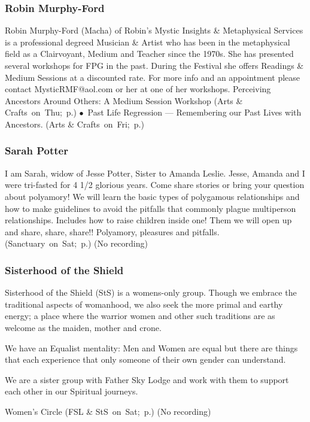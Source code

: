 \subsubsection{Robin Murphy-Ford} %
{  \small  Robin Murphy-Ford (Macha) of Robin's Mystic Insights \& Metaphysical Services is a professional degreed Musician \& Artist who has been in the metaphysical field as a Clairvoyant, Medium and Teacher since the 1970s.  She has presented several workshops for FPG in the past.  During the Festival she offers Readings \& Medium Sessions at a discounted rate.  For more info and an appointment please contact MysticRMF@aol.com or her at one of her workshops.   
 } %
\hspace{2em} {\footnotesize Perceiving Ancestors Around Others:  A Medium Session Workshop (Arts \& Crafts~on~Thu;~p.\pageref{Thu-Ford2}) $\bullet$~Past Life Regression --- Remembering our Past Lives with Ancestors. (Arts \& Crafts~on~Fri;~p.\pageref{Fri-Ford1})}

\vspace{6pt}

\subsubsection{Sarah Potter} %
{  \small  I am Sarah, widow of Jesse Potter, Sister to Amanda Leslie. Jesse, Amanda and I were tri-fasted for 4 1/2 glorious years. Come share stories or bring your question about polyamory! We will learn the basic types of polygamous relationships and how to make guidelines to avoid the pitfalls that commonly plague multiperson relationships. Includes how to raise children inside one! Them we will open up and share, share, share!! } %
\hspace{2em} {\footnotesize Polyamory, pleasures and pitfalls. (Sanctuary~on~Sat;~p.\pageref{Sat-Potter1})}
 {\small (No recording)} 

\vspace{6pt}

\subsubsection{Sisterhood of the Shield} %
{  \small  Sisterhood of the Shield (StS) is a womens-only group. Though we embrace the traditional aspects of womanhood, we also seek the more primal and earthy energy; a place where the warrior women and other such traditions are as welcome as the maiden, mother and crone.

We have an Equalist mentality: Men and Women are equal but there are things that each experience that only someone of their own gender can understand.

We are a sister group with Father Sky Lodge and work with them to support each other in our Spiritual journeys. } %
\hspace{2em} {\footnotesize Women's Circle (FSL \& StS~on~Sat;~p.\pageref{Sat-SOS1})}
 {\small (No recording)} 

